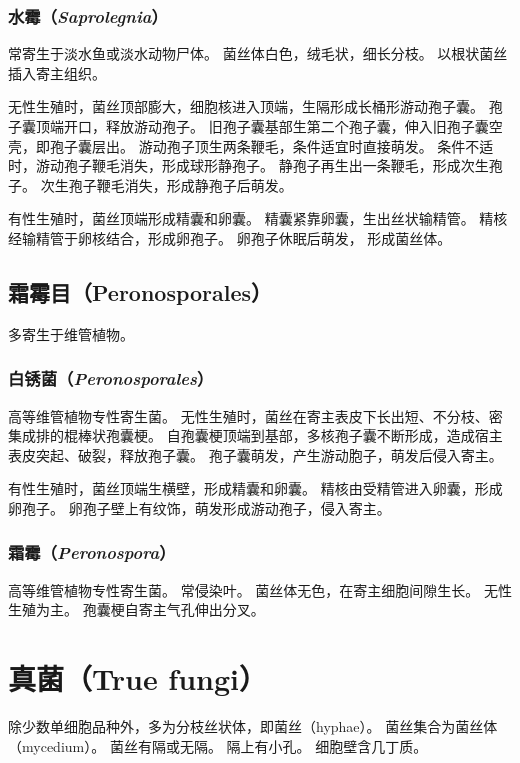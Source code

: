 \documentclass[11pt]{article}
\begin{document}
\subsubsection{水霉（\textit{Saprolegnia}）}
常寄生于淡水鱼或淡水动物尸体。
菌丝体白色，绒毛状，细长分枝。
以根状菌丝插入寄主组织。

\newline

无性生殖时，菌丝顶部膨大，细胞核进入顶端，生隔形成长桶形游动孢子囊。
孢子囊顶端开口，释放游动孢子。
旧孢子囊基部生第二个孢子囊，伸入旧孢子囊空壳，即孢子囊层出。
游动孢子顶生两条鞭毛，条件适宜时直接萌发。
条件不适时，游动孢子鞭毛消失，形成球形静孢子。
静孢子再生出一条鞭毛，形成次生孢子。
次生孢子鞭毛消失，形成静孢子后萌发。

\newline

有性生殖时，菌丝顶端形成精囊和卵囊。
精囊紧靠卵囊，生出丝状输精管。
精核经输精管于卵核结合，形成卵孢子。
卵孢子休眠后萌发，
形成菌丝体。

\subsection{霜霉目（Peronosporales）}
多寄生于维管植物。

\subsubsection{白锈菌（\textit{Peronosporales}）}
高等维管植物专性寄生菌。
无性生殖时，菌丝在寄主表皮下长出短、不分枝、密集成排的棍棒状孢囊梗。
自孢囊梗顶端到基部，多核孢子囊不断形成，造成宿主表皮突起、破裂，释放孢子囊。
孢子囊萌发，产生游动胞子，萌发后侵入寄主。

\newline

有性生殖时，菌丝顶端生横壁，形成精囊和卵囊。
精核由受精管进入卵囊，形成卵孢子。
卵孢子壁上有纹饰，萌发形成游动孢子，侵入寄主。

\subsubsection{霜霉（\textit{Peronospora}）}
高等维管植物专性寄生菌。
常侵染叶。
菌丝体无色，在寄主细胞间隙生长。
无性生殖为主。
孢囊梗自寄主气孔伸出分叉。

\section{真菌（True fungi）}
除少数单细胞品种外，多为分枝丝状体，即菌丝（hyphae）。
菌丝集合为菌丝体（mycedium）。
菌丝有隔或无隔。
隔上有小孔。
细胞壁含几丁质。
\end{document}
